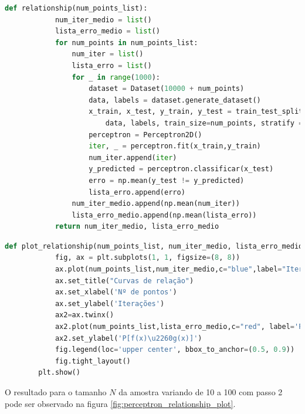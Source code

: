 \begin{enumerate}
    \begin{lstlisting}[language=Python, caption=Cálculo da probabilidade de erro e do número de iterações, label=cod:perceptron_relationship]
        def relationship(num_points_list):
            num_iter_medio = list()
            lista_erro_medio = list()
            for num_points in num_points_list:
                num_iter = list()
                lista_erro = list()
                for _ in range(1000):
                    dataset = Dataset(10000 + num_points)
                    data, labels = dataset.generate_dataset()
                    x_train, x_test, y_train, y_test = train_test_split(
                        data, labels, train_size=num_points, stratify = labels)
                    perceptron = Perceptron2D()
                    iter, _ = perceptron.fit(x_train,y_train)
                    num_iter.append(iter)
                    y_predicted = perceptron.classificar(x_test)
                    erro = np.mean(y_test != y_predicted)
                    lista_erro.append(erro)
                num_iter_medio.append(np.mean(num_iter))  
                lista_erro_medio.append(np.mean(lista_erro))
            return num_iter_medio, lista_erro_medio
    \end{lstlisting}

    \begin{lstlisting}[language=Python, caption=Plot da probabilidade de erro e do número de iterações, label=cod:perceptron_relationship_plot]
        def plot_relationship(num_points_list, num_iter_medio, lista_erro_medio):
            fig, ax = plt.subplots(1, 1, figsize=(8, 8))
            ax.plot(num_points_list,num_iter_medio,c="blue",label="Iterações")
            ax.set_title("Curvas de relação")
            ax.set_xlabel('Nº de pontos')
            ax.set_ylabel('Iterações')
            ax2=ax.twinx()
            ax2.plot(num_points_list,lista_erro_medio,c="red", label='P[f(x)\u2260g(x)]')
            ax2.set_ylabel('P[f(x)\u2260g(x)]')
            fig.legend(loc='upper center', bbox_to_anchor=(0.5, 0.9))
            fig.tight_layout()
        plt.show()
    \end{lstlisting}

    O resultado para o tamanho $N$ da amostra variando de 10 a 100 com passo 2 pode ser observado na figura \ref{fig:perceptron_relationship_plot}. 


\end{enumerate}
